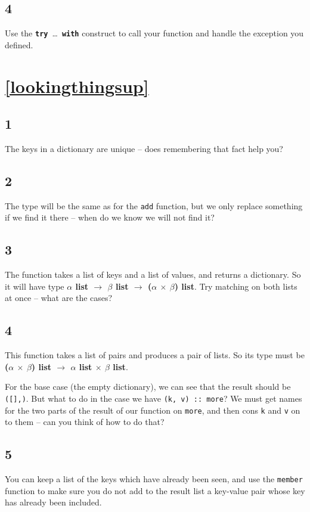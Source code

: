 \documentclass[]{book}
\begin{document}
\subsection*{4}
Use the \texttt{\textbf{try}}\ \ldots\ \texttt{\textbf{with}} construct to call your function and handle the exception you defined.

\section*{\ref{lookingthingsup}\\ }
\subsection*{1}
The keys in a dictionary are unique -- does remembering that fact help you?

\subsection*{2}
The type will be the same as for the \texttt{add} function, but we only replace something if we find it there -- when do we know we will not find it?

\subsection*{3}
The function takes a list of keys and a list of values, and returns a dictionary. So it will have type \textbf{\textrm{$\alpha$ list $\rightarrow$ $\beta$ list $\rightarrow$ \textmd{(}$\alpha$ $\times$ $\beta$\textmd{)} list}}. Try matching on both lists at once -- what are the cases?

\subsection*{4}
This function takes a list of pairs and produces a pair of lists. So its type must be \textrm{\textbf{\textmd{(}$\alpha$ $\times$ $\beta$\textmd{)} list $\rightarrow$ $\alpha$ list $\times$ $\beta$ list}}.

For the base case (the empty dictionary), we can see that the result should be \texttt{([],\! [])}. But what to do in the case we have \texttt{(k, v)\! :: \!\!\!\!more}? We must get names for the two parts of the result of our function on \texttt{more}, and then cons \texttt{k} and \texttt{v} on to them -- can you think of how to do that?

\subsection*{5}
You can keep a list of the keys which have already been seen, and use the \texttt{member} function to make sure you do not add to the result list a key-value pair whose key has already been included.
\end{document}
